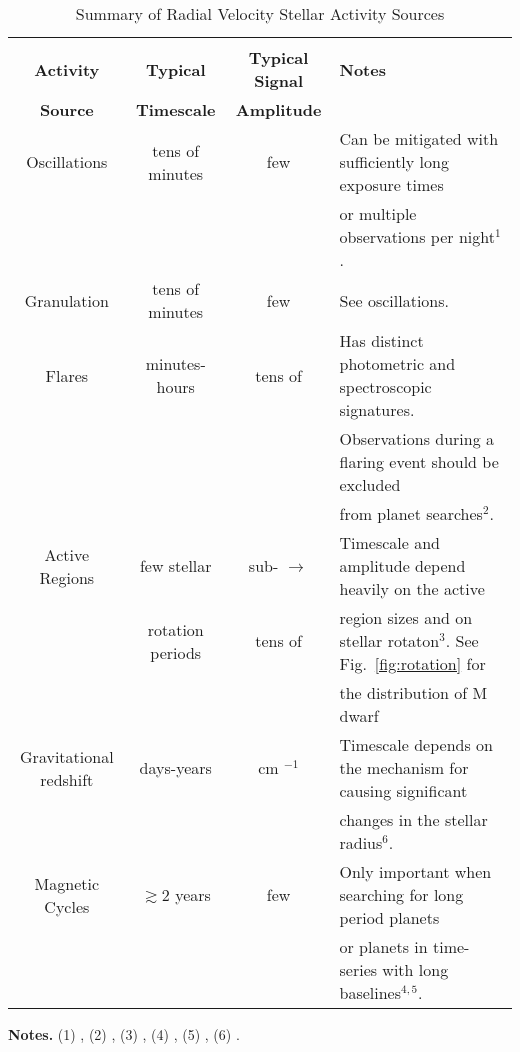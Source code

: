 \begin{table*}
\small
\renewcommand{\arraystretch}{0.7}
\caption{Summary of Radial Velocity Stellar Activity Sources}
\label{table:activity}
\begin{tabular}{cccl}
  \hline \\ [-1ex]
  \textbf{Activity} & \textbf{Typical} & \textbf{Typical Signal} & \textbf{Notes} \\
  \textbf{Source} & \textbf{Timescale} & \textbf{Amplitude} & \\
  \hline
  Oscillations & tens of minutes & few \mps{} & Can be mitigated with sufficiently long exposure times \\
  &&&or multiple observations per night$^1$. \\
  \hline
  Granulation & tens of minutes & few \mps{} & See oscillations.  \\
  \hline
  Flares & minutes-hours & tens of \mps{} & Has distinct photometric and spectroscopic signatures. \\ 
  &&&Observations during a flaring event should be excluded \\
  &&& from planet searches$^2$. \\
  \hline
  Active Regions & few stellar & sub-\mps{} $\to$ & Timescale and amplitude depend heavily on the active \\
  & rotation periods & tens of \mps{} & region sizes and on stellar rotaton$^3$. See Fig.~\ref{fig:rotation} for \\
  &&& the distribution of M dwarf \prot{.} \\
  \hline
  Gravitational redshift & days-years & cm $^{-1}$ & Timescale depends on the mechanism for causing significant \\
  &&& changes in the stellar radius$^6$. \\
  \hline
  Magnetic Cycles & $\gtrsim 2$ years & few \mps{} & Only important when searching for long period planets \\
  &&& or planets in time-series with long baselines$^{4,5}$.
\end{tabular}
\begin{list}{}{}
\item {\bf{Notes.}}
      (1) \cite{dumusque11a}, (2) \cite{reiners09}, (3) \cite{dumusque11b}, (4) \cite{santos10},
      (5) \cite{robertson14}, (6) \cite{cegla12}. \\
\end{list}
\end{table*}
